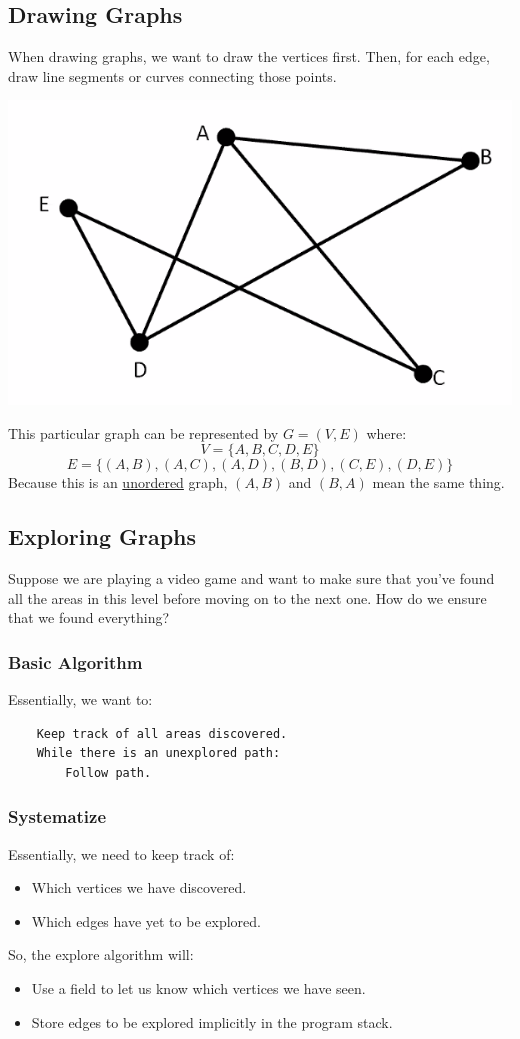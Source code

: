 \documentclass[letterpaper]{article}
\begin{document}
\subsection{Drawing Graphs}
When drawing graphs, we want to draw the vertices first. Then, for each edge, draw line segments or curves connecting those points. 
\begin{center}
    \includegraphics[scale=0.5]{../assets/graph.png}
\end{center}
This particular graph can be represented by $G = (V, E)$ where: 
\[V = \{A, B, C, D, E\}\]
\[E = \{(A, B), (A, C), (A, D), (B, D), (C, E), (D, E)\}\]
Because this is an \underline{unordered} graph, $(A, B)$ and $(B, A)$ mean the same thing. 

\subsection{Exploring Graphs}
Suppose we are playing a video game and want to make sure that you've found all the areas in this level before moving on to the next one. How do we ensure that we found everything? 

\subsubsection{Basic Algorithm}
Essentially, we want to: 
\begin{verbatim}
    Keep track of all areas discovered.
    While there is an unexplored path:
        Follow path. 
\end{verbatim}

\subsubsection{Systematize}
Essentially, we need to keep track of: 
\begin{itemize}
    \item Which vertices we have discovered. 
    \item Which edges have yet to be explored.
\end{itemize}
So, the explore algorithm will:
\begin{itemize}
    \item Use a field  to let us know which vertices we have seen.
    \item Store edges to be explored implicitly in the program stack. 
\end{itemize}
\end{document}
